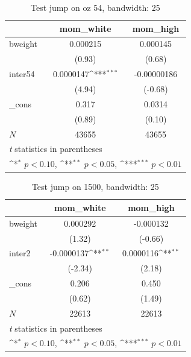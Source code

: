 \documentclass[a4paper,11pt]{article}
\begin{document}

\begin{table}[htbp]\centering
\def\sym#1{\ifmmode^{#1}\else\(^{#1}\)\fi}
\caption{Test jump on oz 54, bandwidth: 25}
\label{A4.oz54}
\begin{tabular}{l*{2}{c}}
\hline\hline
            &\multicolumn{1}{c}{mom\_white}&\multicolumn{1}{c}{mom\_high}\\
\hline
bweight     &    0.000215         &    0.000145         \\
            &      (0.93)         &      (0.68)         \\
[1em]
inter54     &   0.0000147\sym{***}& -0.00000186         \\
            &      (4.94)         &     (-0.68)         \\
[1em]
\_cons      &       0.317         &      0.0314         \\
            &      (0.89)         &      (0.10)         \\
\hline
\(N\)       &       43655         &       43655         \\
\hline\hline
\multicolumn{3}{l}{\footnotesize \textit{t} statistics in parentheses}\\
\multicolumn{3}{l}{\footnotesize \sym{*} \(p<0.10\), \sym{**} \(p<0.05\), \sym{***} \(p<0.01\)}\\
\end{tabular}
\end{table}


\begin{table}[htbp]\centering
\def\sym#1{\ifmmode^{#1}\else\(^{#1}\)\fi}
\caption{Test jump on 1500, bandwidth: 25}
\label{A4.1500}
\begin{tabular}{l*{2}{c}}
\hline\hline
            &\multicolumn{1}{c}{mom\_white}&\multicolumn{1}{c}{mom\_high}\\
\hline
bweight     &    0.000292         &   -0.000132         \\
            &      (1.32)         &     (-0.66)         \\
[1em]
inter2      &  -0.0000137\sym{**} &   0.0000116\sym{**} \\
            &     (-2.34)         &      (2.18)         \\
[1em]
\_cons      &       0.206         &       0.450         \\
            &      (0.62)         &      (1.49)         \\
\hline
\(N\)       &       22613         &       22613         \\
\hline\hline
\multicolumn{3}{l}{\footnotesize \textit{t} statistics in parentheses}\\
\multicolumn{3}{l}{\footnotesize \sym{*} \(p<0.10\), \sym{**} \(p<0.05\), \sym{***} \(p<0.01\)}\\
\end{tabular}
\end{table}
\end{document}
